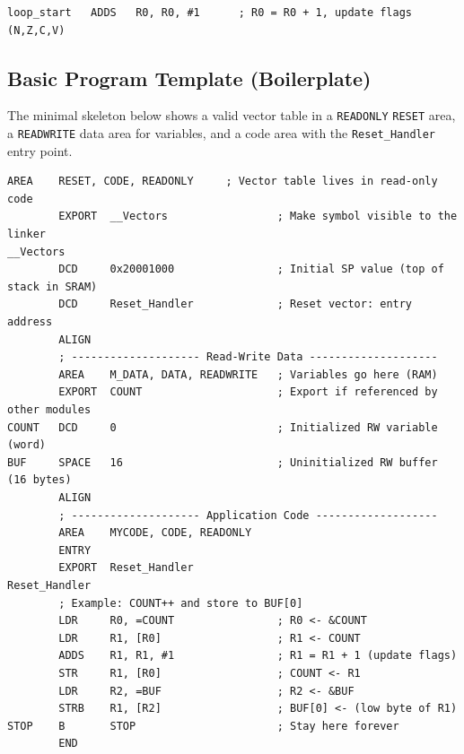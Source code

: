 \begin{lstlisting}[caption={Instruction format example}]
loop_start   ADDS   R0, R0, #1      ; R0 = R0 + 1, update flags (N,Z,C,V)
\end{lstlisting}


\subsection{Basic Program Template (Boilerplate)}

The minimal skeleton below shows a valid vector table in a \texttt{READONLY} \texttt{RESET} area, a \texttt{READWRITE} data area for variables, and a code area with the \texttt{Reset\_Handler} entry point.

\begin{lstlisting}[caption={Cortex-M4 boilerplate with READWRITE data}]
        AREA    RESET, CODE, READONLY     ; Vector table lives in read-only code
        EXPORT  __Vectors                 ; Make symbol visible to the linker
__Vectors
        DCD     0x20001000                ; Initial SP value (top of stack in SRAM)
        DCD     Reset_Handler             ; Reset vector: entry address
        ALIGN        
        ; -------------------- Read-Write Data --------------------
        AREA    M_DATA, DATA, READWRITE   ; Variables go here (RAM)
        EXPORT  COUNT                     ; Export if referenced by other modules
COUNT   DCD     0                         ; Initialized RW variable (word)
BUF     SPACE   16                        ; Uninitialized RW buffer (16 bytes)
        ALIGN        
        ; -------------------- Application Code -------------------
        AREA    MYCODE, CODE, READONLY
        ENTRY
        EXPORT  Reset_Handler
Reset_Handler
        ; Example: COUNT++ and store to BUF[0]
        LDR     R0, =COUNT                ; R0 <- &COUNT
        LDR     R1, [R0]                  ; R1 <- COUNT
        ADDS    R1, R1, #1                ; R1 = R1 + 1 (update flags)
        STR     R1, [R0]                  ; COUNT <- R1        
        LDR     R2, =BUF                  ; R2 <- &BUF
        STRB    R1, [R2]                  ; BUF[0] <- (low byte of R1)
STOP    B       STOP                      ; Stay here forever
        END
\end{lstlisting}

